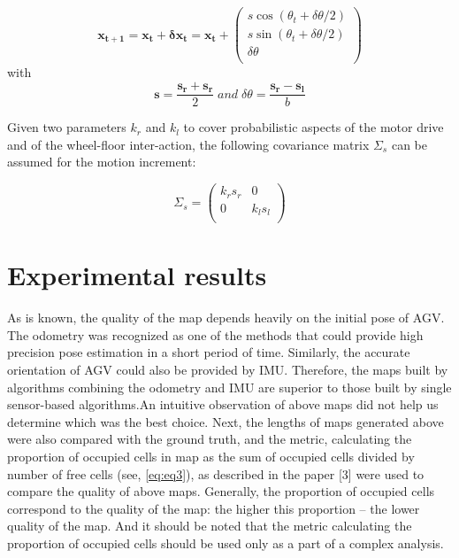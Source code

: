 \documentclass{article}
\begin{document}
\begin{equation}
\mathbf{x_{t+1}}=\mathbf{x_{t}}+\mathbf{\delta x_{t}}=\mathbf{x_{t}}+\left(\begin{array}{c}
     s \cos{\left( \theta_{t}+\delta\theta/2\right)}
     \\
     s \sin{\left(\theta_{t}+\delta\theta/2\right)}
     \\
     \delta\theta
     \\
\end{array}
  \right)
  \label{eq:equation1}
\end{equation}
with
\begin{equation}
    \mathbf{s}=\frac{\mathbf{s_{r}}+\mathbf{s_{r}}}{2}\;and\;\delta\theta =\frac{\mathbf{s_{r}}-\mathbf{s_{l}}}{b} \nonumber
\end{equation}

Given two parameters $k_{r}$ and $k_{l}$ to cover probabilistic aspects of the motor drive and of the wheel-floor inter-action, the following covariance matrix $\Sigma_{s}$ can be assumed for the motion increment:

\begin{equation}
    \Sigma_{s}=\left(\begin{array}{cc}
    k_{r}s_{r} & 0
    \\
     0 & k_{l}s_{l}
     \\
    \end{array}
    \right)
\end{equation}


\section{\label{sec:Experimental results}Experimental results}
As is known, the quality of the map depends heavily on the initial pose of AGV. The odometry was recognized as one of the methods that could provide high precision pose estimation in a short period of time.  Similarly, the accurate orientation of AGV could also be provided by IMU. Therefore, the maps built by algorithms combining the odometry and IMU are superior to those built by single sensor-based algorithms.An intuitive observation of above maps did not help us determine which was the best choice.  Next, the lengths of maps generated above were also compared with the ground truth, and the metric, calculating the proportion of occupied cells in map as the sum of occupied cells divided by number of free cells (see, \cref{eq:eq3}), as described in the paper [3] were used to compare the quality of above maps.  Generally, the proportion of occupied cells correspond to the quality of the map:  the higher this proportion – the lower quality of the map.  And it should be noted that the metric calculating the proportion of occupied cells should be used only as a part of a complex analysis.
\end{document}
